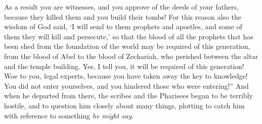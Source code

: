\begin{biblechapter}
\verse As a result you are witnesses, and you approve of the deeds of your fathers, because they killed them and you build their tombs!
\verse For this reason also the wisdom of God said, ‘I will send to them prophets and apostles, and some of them they will kill and persecute,’
\verse so that the blood of all the prophets that has been shed from the foundation of the world may be required of this generation,
\verse from the blood of Abel to the blood of Zechariah, who perished between the altar and the temple building. Yes, I tell you, it will be required of this generation!
\verse Woe to you, legal experts, because you have taken away the key to knowledge! You did not enter yourselves, and you hindered those who were entering!”
\verse And when he departed from there, the scribes and the Pharisees began to be terribly hostile, and to question him closely about many things,
\verse plotting to catch him with reference to something \textit{he might say}.
\end{biblechapter}

